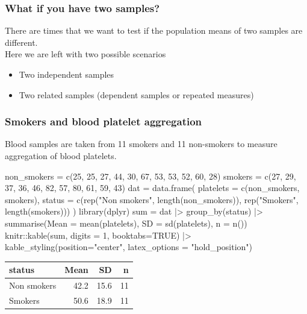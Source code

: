 \documentclass[a4paper]{article}
\begin{document}
\subsubsection{What if you have two samples?}
There are times that we want to test if the population means of two samples are different.\\
Here we are left with two possible scenarios
\begin{itemize}
	\item Two independent samples
	\item Two related samples (dependent samples or repeated measures)
\end{itemize}
\subsubsection{Smokers and blood platelet aggregation}
Blood samples are taken from 11 smokers and 11 non-smokers to measure aggregation of blood platelets.
\begin{Schunk}
\begin{Sinput}
non_smokers = c(25, 25, 27, 44, 30, 67, 53, 53, 52, 60, 28)
smokers =  c(27, 29, 37, 36, 46, 82, 57, 80, 61, 59, 43)
dat = data.frame(
  platelets = c(non_smokers, smokers),
  status = c(rep("Non smokers", length(non_smokers)), 
  rep("Smokers", length(smokers)))
)
library(dplyr)
sum = dat |>
  group_by(status) |>
  	summarise(Mean = mean(platelets),
  	SD = sd(platelets), 
  	n = n())
knitr::kable(sum, digits = 1, booktabs=TRUE) |>
  kable_styling(position="center", latex_options = "hold_position")
\end{Sinput}
\begin{table}[!h]
\centering
\begin{tabular}{lrrr}
\toprule
status & Mean & SD & n\\
\midrule
Non smokers & 42.2 & 15.6 & 11\\
Smokers & 50.6 & 18.9 & 11\\
\bottomrule
\end{tabular}
\end{table}

\end{Schunk}
\end{document}

